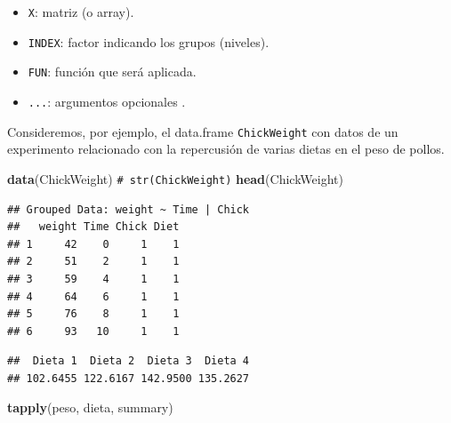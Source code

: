 \documentclass[
]{book}
\newenvironment{Shaded}{\begin{snugshade}}{\end{snugshade}}
\newcommand{\CommentTok}[1]{\textcolor[rgb]{0.56,0.35,0.01}{\textit{#1}}}
\newcommand{\FunctionTok}[1]{\textcolor[rgb]{0.13,0.29,0.53}{\textbf{#1}}}
\newcommand{\NormalTok}[1]{#1}
\newcommand{\OtherTok}[1]{\textcolor[rgb]{0.56,0.35,0.01}{#1}}
\newcommand{\SpecialCharTok}[1]{\textcolor[rgb]{0.81,0.36,0.00}{\textbf{#1}}}
\newcommand{\StringTok}[1]{\textcolor[rgb]{0.31,0.60,0.02}{#1}}
\providecommand{\tightlist}{%
  \setlength{\itemsep}{0pt}\setlength{\parskip}{0pt}}
\theoremstyle{break}
\theoremstyle{nonumberplain}
\renewcommand{\CommentTok}[1]{\textcolor[rgb]{0.41,0.41,0.41}{\texttt{#1}}}
\begin{document}
\begin{itemize}
\tightlist
\item
  \texttt{X}: matriz (o array).
\item
  \texttt{INDEX}: factor indicando los grupos (niveles).
\item
  \texttt{FUN}: función que será aplicada.
\item
  \texttt{...}: argumentos opcionales .
\end{itemize}

Consideremos, por ejemplo, el data.frame \texttt{ChickWeight} con datos de un
experimento relacionado con la repercusión de varias dietas en el peso
de pollos.

\begin{Shaded}
\begin{Highlighting}[]
\FunctionTok{data}\NormalTok{(ChickWeight)}
\CommentTok{\# str(ChickWeight)}
\FunctionTok{head}\NormalTok{(ChickWeight)}
\end{Highlighting}
\end{Shaded}

\begin{verbatim}
## Grouped Data: weight ~ Time | Chick
##   weight Time Chick Diet
## 1     42    0     1    1
## 2     51    2     1    1
## 3     59    4     1    1
## 4     64    6     1    1
## 5     76    8     1    1
## 6     93   10     1    1
\end{verbatim}

\begin{Shaded}
\end{Shaded}

\begin{verbatim}
##  Dieta 1  Dieta 2  Dieta 3  Dieta 4 
## 102.6455 122.6167 142.9500 135.2627
\end{verbatim}

\begin{Shaded}
\begin{Highlighting}[]
\FunctionTok{tapply}\NormalTok{(peso, dieta, summary)}
\end{Highlighting}
\end{Shaded}
\end{document}

